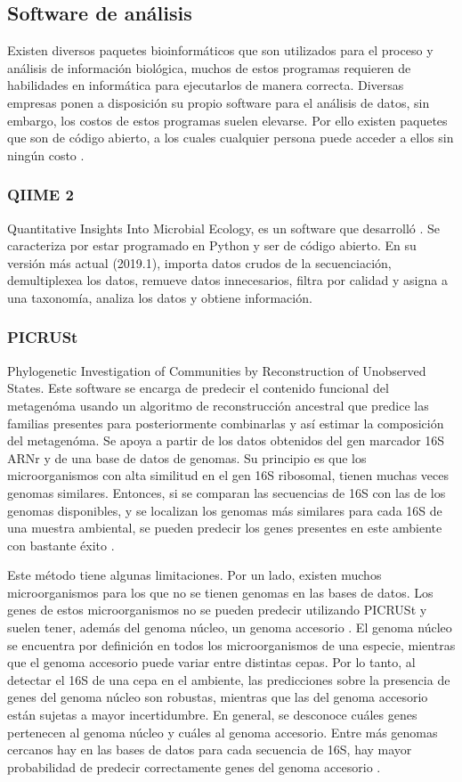 \documentclass[12pt,letterpaper,oneside]{report}
\begin{document}
\subsection{Software de análisis}
Existen diversos paquetes bioinformáticos que son utilizados para el proceso y análisis de información biológica, muchos de estos programas requieren de habilidades en informática para ejecutarlos de manera correcta. Diversas empresas ponen a disposición su propio software para el análisis de datos, sin embargo, los costos de estos programas suelen elevarse. Por ello existen paquetes que son de código abierto, a los cuales cualquier persona puede acceder a ellos sin ningún costo \autocite{Almeida2019,Upadhyayula2019}.
\subsubsection{QIIME 2}
Quantitative Insights Into Microbial Ecology, es un software que desarrolló \textcite{Caporaso2010a}. Se caracteriza por estar programado en Python y ser de código abierto. En su versión más actual (2019.1), importa datos crudos de la secuenciación, demultiplexea los datos, remueve datos innecesarios, filtra por calidad y asigna a una taxonomía, analiza los datos y obtiene información.
\subsubsection{PICRUSt}
Phylogenetic Investigation of Communities by Reconstruction of Unobserved States. Este software se encarga de predecir el contenido funcional del metagenóma usando un algoritmo de reconstrucción ancestral que predice las familias presentes para posteriormente combinarlas y así estimar la composición del metagenóma. Se apoya a partir de los datos obtenidos del gen marcador 16S ARNr y de una base de datos de genomas. Su principio es que los microorganismos con alta similitud en el gen 16S ribosomal, tienen muchas veces genomas similares. Entonces, si se comparan las secuencias de 16S con las de los genomas disponibles, y se localizan los genomas más similares para cada 16S de una muestra ambiental, se pueden predecir los genes presentes en este ambiente con bastante éxito \autocite{Langille2013}.
\par
Este método tiene algunas limitaciones. Por un lado, existen muchos microorganismos para los que no se tienen genomas en las bases de datos. Los genes de estos microorganismos no se pueden predecir utilizando PICRUSt y suelen tener, además del genoma núcleo, un genoma accesorio \autocite{Alcaraz2010}. El genoma núcleo se encuentra por definición en todos los microorganismos de una especie, mientras que el genoma accesorio puede variar entre distintas cepas. Por lo tanto, al detectar el 16S de una cepa en el ambiente, las predicciones sobre la presencia de genes del genoma núcleo son robustas, mientras que las del genoma accesorio están sujetas a mayor incertidumbre. En general, se desconoce cuáles genes pertenecen al genoma núcleo y cuáles al genoma accesorio. Entre más genomas cercanos hay en las bases de datos para cada secuencia de 16S, hay mayor probabilidad de predecir correctamente genes del genoma accesorio \autocite{Langille2013}.
\end{document}
